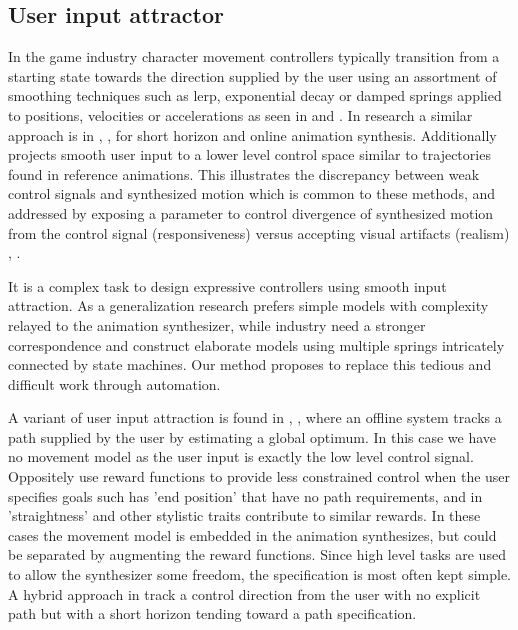 \subsection{User input attractor}
In the game industry character movement controllers typically transition from a starting state towards the direction supplied by the user using an assortment of smoothing techniques such as lerp, exponential decay or damped springs applied to positions, velocities or accelerations as seen in \citep{buttner20} and \citep{holden21}. 
In research a similar approach is in \citep{mccann07}, \citep{holden.16}, \citep{zhang18} for short horizon and online animation synthesis. Additionally \citep{startke20} projects smooth user input to a lower level control space similar to trajectories found in reference animations. This illustrates the discrepancy between weak control signals and synthesized motion which is common to these methods, and addressed by exposing a parameter to control divergence of synthesized motion from the control signal (responsiveness) versus accepting visual artifacts (realism) \citep{clavet16}, \citep{zadziuk16}. 

It is a complex task to design expressive controllers using smooth input attraction. As a generalization research prefers simple models with complexity relayed to the animation synthesizer, while industry need a stronger correspondence and construct elaborate models using multiple springs intricately connected by state machines. Our method proposes to replace this tedious and difficult work through automation. 

A variant of user input attraction is found in \citep{lee03}, \citep{safanona07}, \citep{treuille07} where an offline system tracks a path supplied by the user by estimating a global optimum. In this case we have no movement model as the user input is exactly the low level control signal. Oppositely \citep{kovar02} use reward functions to provide less constrained control when the user specifies goals such has 'end position' that have no path requirements, and in \citep{lee18} 'straightness' and other stylistic traits contribute to similar rewards. In these cases the movement model is embedded in the animation synthesizes, but could be separated by augmenting the reward functions. Since high level tasks are used to allow the synthesizer some freedom, the specification is most often kept simple. A hybrid approach in \citep{lee10} track a control direction from the user with no explicit path but with a short horizon tending toward a path specification.

